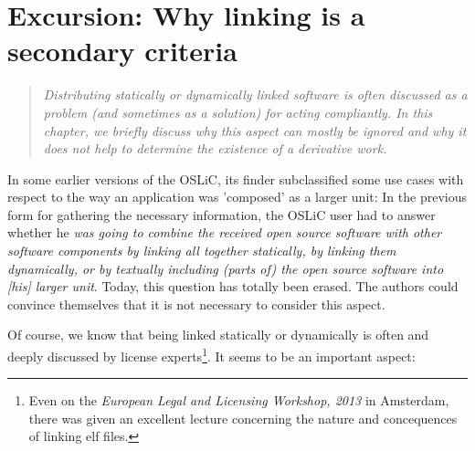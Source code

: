 %
%
%
%
%



\section{Excursion: Why linking is a secondary criteria}
\label{sec:LinkingSecondary}
\footnotesize
\begin{quote}\itshape
Distributing statically or dynamically linked software is often discussed as a
problem (and sometimes as a solution) for acting compliantly. In this chapter,
we briefly discuss why this aspect can mostly be ignored and why it does not
help to determine the existence of a derivative work.
\end{quote}
\normalsize

In some earlier versions of the OSLiC, its finder subclassified some use cases
with respect to the way an application was 'composed' as a larger unit: In the
previous form for gathering the necessary information, the OSLiC user had to
answer whether he \emph{was going to combine the received open source software
with other software components by linking all together statically, by linking
them dynamically, or by textually including (parts of) the open source software
into [his] larger unit}. Today, this question has totally been erased. The
authors could convince themselves that it is not necessary to consider this
aspect.

Of course, we know that being linked statically or dynamically is often and
deeply discussed by license experts\footnote{Even on the \emph{European Legal
and Licensing Workshop, 2013} in Amsterdam, there was given an excellent lecture
concerning the nature and concequences of linking elf files.}. It seems to be an
important aspect:

